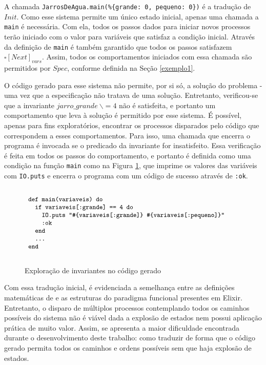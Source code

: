 A chamada \texttt{JarrosDeAgua.main(\%\{grande: 0, pequeno: 0\})} é a tradução de $Init$. Como esse sistema permite um único estado inicial, apenas uma chamada a \texttt{main} é necessária. Com ela, todos os passos dados para iniciar novos processos terão iniciado com o valor para variáveis que satisfaz a condição inicial. Através da definição de \texttt{main} é também garantido que todos os passos satisfazem $\square [Next]_{vars}$. Assim, todos os comportamentos iniciados com essa chamada são permitidos por $Spec$, conforme definida na Seção \ref{exemplo1}.

O código gerado para esse sistema não permite, por si só, a solução do problema - uma vez que a especificação não tratava de uma solução. Entretanto, verificou-se que a invariante $jarro\_grande\ \backslash= 4$ não é satisfeita, e portanto um comportamento que leva à solução é permitido por esse sistema. É possível, apenas para fins exploratórios, encontrar os processos disparados pelo código que correspondem a esses comportamentos. Para isso, uma chamada que encerra o programa é invocada se o predicado da invariante for insatisfeito. Essa verificação é feita em todos os passos do comportamento, e portanto é definida como uma condição na função \texttt{main} como na Figura \ref{fig:invariant-ex1}, que imprime os valores das variáveis com \texttt{IO.puts} e encerra o programa com um código de sucesso através de \texttt{:ok}.

\begin{figure}[h]
  \centering
  $\progfig{
  ~def main(variaveis) do\\
  ~~~if variaveis[:grande] == 4 do\\
  ~~~~~IO.puts "\#\{variaveis[:grande]\} \#\{variaveis[:pequeno]\}"\\
  ~~~~~:ok\\
  ~~~end\\
  ~~~\dots\\
  ~end
  }$
  \caption{Exploração de invariantes no código gerado}
\label{fig:invariant-ex1}
\end{figure}

Com essa tradução inicial, é evidenciada a semelhança entre as definições
matemáticas de \TLA e as estruturas do paradigma funcional presentes em Elixir.
Entretanto, o disparo de múltiplos processos contemplando todos os caminhos
possíveis do sistema não é viável dada a explosão de estados nem possui
aplicação prática de muito valor. Assim, se apresenta a maior dificuldade
encontrada durante o desenvolvimento deste trabalho: como traduzir de forma que
o código gerado permita todos os caminhos e ordens possíveis sem que haja
explosão de estados.

